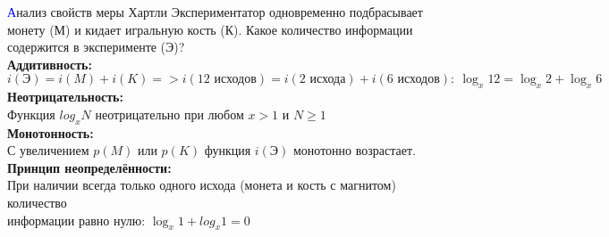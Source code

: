 \begin{frame}[t]{\textcolor{blue}{А}нализ свойств меры Хартли}
\noindent Экспериментатор одновременно подбрасывает монету (М) и кидает игральную кость (К).
Какое количество информации содержится в эксперименте (Э)?\\
\vspace{1.5em}
\color[rgb]{0,0.7,0.4}
\noindent\textbf{Аддитивность:}\\
\color{black}
$i(\mbox{Э})=i(M)+i(K)=>i(\mbox{12 исходов})=i(\mbox{2 исхода})+i(\mbox{6 исходов}):\ \log_x12=\log_x2+\log_x6$\\
\color[rgb]{0,0.7,0.4}
\noindent\textbf{Неотрицательность:}\\
\color{black}
Функция $log_xN$ неотрицательно при любом $x>1$ и $N\geq1$\\
\color[rgb]{0,0.7,0.4}
\noindent\textbf{Монотонность:}\\
\color{black}
С увеличением $p(M)$ или $p(K)$ функция $i(\mbox{Э})$ монотонно возрастает.\\
\color[rgb]{0,0.7,0.4}
\noindent\textbf{Принцип неопределённости:}\\
\color{black}
При наличии всегда только одного исхода (монета и кость с магнитом) количество\\
информации равно нулю: $\log_x1+log_x1=0$
\end{frame}